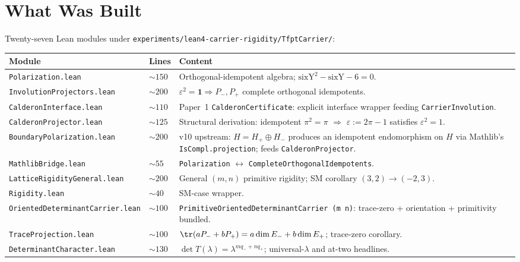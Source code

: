 \section{What Was Built}
\label{sec:built}

Twenty-seven Lean modules under
\texttt{experiments/lean4-carrier-rigidity/TfptCarrier/}:

\begin{center}
\footnotesize
\begin{tabularx}{0.98\textwidth}{@{}p{}p{}Y@{}}
\toprule
\textbf{Module} & \textbf{Lines} & \textbf{Content} \\
\midrule
\texttt{Polarization.lean}        & $\sim150$ & Orthogonal-idempotent algebra; $\mathrm{sixY}^2-\mathrm{sixY}-6=0$. \\
\texttt{InvolutionProjectors.lean}& $\sim200$ & $\varepsilon^2=\mathbf 1 \Rightarrow P_-, P_+$ complete orthogonal idempotents. \\
\texttt{CalderonInterface.lean}   & $\sim110$ & Paper~1 \texttt{CalderonCertificate}: explicit interface wrapper feeding \texttt{CarrierInvolution}. \\
\texttt{CalderonProjector.lean}   & $\sim125$ & Structural derivation: idempotent $\pi^2=\pi$ $\Rightarrow$ $\varepsilon := 2\pi-1$ satisfies $\varepsilon^2 = 1$. \\
\texttt{BoundaryPolarization.lean}& $\sim200$ & v10 upstream: $H = H_+ \oplus H_-$ produces an idempotent endomorphism on $H$ via Mathlib's \texttt{IsCompl.projection}; feeds \texttt{CalderonProjector}. \\
\texttt{MathlibBridge.lean}       & $\sim55$  & \texttt{Polarization} $\leftrightarrow$ \texttt{CompleteOrthogonalIdempotents}. \\
\texttt{LatticeRigidityGeneral.lean}&$\sim200$& General $(m,n)$ primitive rigidity; SM corollary $(3,2)\to(-2,3)$. \\
\texttt{Rigidity.lean}            & $\sim40$  & SM-case wrapper. \\
\texttt{OrientedDeterminantCarrier.lean} & $\sim100$ & \texttt{PrimitiveOrientedDeterminantCarrier (m n)}: trace-zero + orientation + primitivity bundled. \\
\texttt{TraceProjection.lean}     & $\sim100$ & $\tr(aP_-+bP_+) = a\dim E_- + b\dim E_+$; trace-zero corollary. \\
\texttt{DeterminantCharacter.lean}& $\sim130$ & $\det T(\lambda) = \lambda^{m q_-+n q_+}$; universal-$\lambda$ and at-two headlines. \\

\end{tabularx}
\end{center}

